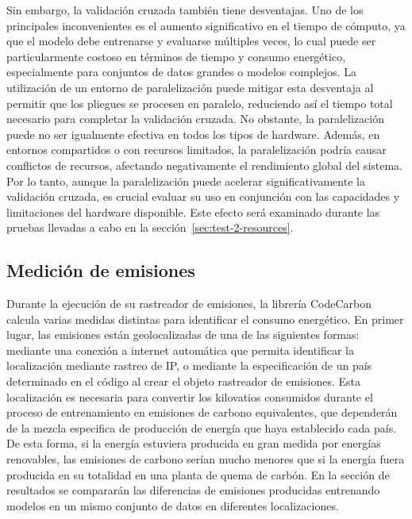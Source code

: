 Sin embargo, la validación cruzada también tiene desventajas. Uno de los principales inconvenientes es el aumento significativo en el tiempo de cómputo, ya que el modelo debe entrenarse y evaluarse múltiples veces, lo cual puede ser particularmente costoso en términos de tiempo y consumo energético, especialmente para conjuntos de datos grandes o modelos complejos. La utilización de un entorno de paralelización puede mitigar esta desventaja al permitir que los pliegues se procesen en paralelo, reduciendo así el tiempo total necesario para completar la validación cruzada. No obstante, la paralelización puede no ser igualmente efectiva en todos los tipos de hardware. Además, en entornos compartidos o con recursos limitados, la paralelización podría causar conflictos de recursos, afectando negativamente el rendimiento global del sistema. Por lo tanto, aunque la paralelización puede acelerar significativamente la validación cruzada, es crucial evaluar su uso en conjunción con las capacidades y limitaciones del hardware disponible. Este efecto será examinado durante las pruebas llevadas a cabo en la sección~\ref{sec:test-2-resources}.


\subsection{Medición de emisiones}

Durante la ejecución de su rastreador de emisiones, la librería CodeCarbon calcula varias medidas distintas para identificar el consumo energético. En primer lugar, las emisiones están geolocalizadas de una de las siguientes formas: mediante una conexión a internet automática que permita identificar la localización mediante rastreo de IP, o mediante la especificación de un país determinado en el código al crear el objeto rastreador de emisiones. Esta localización es necesaria para convertir los kilovatios consumidos durante el proceso de entrenamiento en emisiones de carbono equivalentes, que dependerán de la mezcla especifica de producción de energía que haya establecido cada país. De esta forma, si la energía estuviera producida en gran medida por energías renovables, las emisiones de carbono serían mucho menores que si la energía fuera producida en su totalidad en una planta de quema de carbón. En la sección de resultados se compararán las diferencias de emisiones producidas entrenando modelos en un mismo conjunto de datos en diferentes localizaciones.

